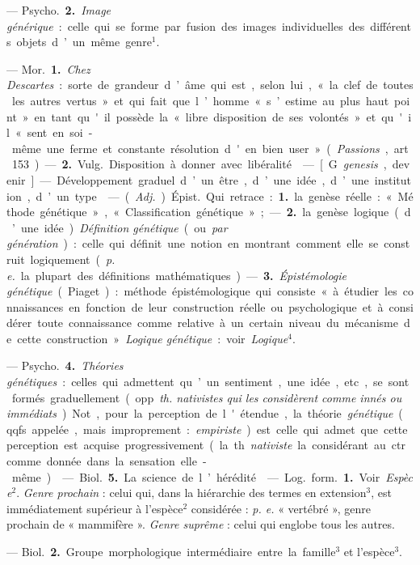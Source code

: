 \begin{itemize}[leftmargin=1cm, label=, itemsep=1pt]
— \si{Psycho.} {\bf 2.} {\it Image générique} : celle qui se forme par fusion
des images individuelles des différents objets d’un même genre$^1$.

 — \si{Mor.} {\bf 1.} {\it Chez Descartes} : sorte de grandeur
d’âme qui est, selon lui, « la clef de toutes les autres vertus » et qui fait
que l’homme « s’estime au plus haut point » en tant qu'il possède la « libre
disposition de ses volontés » et qu'il « sent en soi-même une ferme et
constante résolution d'en bien user » ({\it Passions}, art. 153). —
{\bf 2.} \si{Vulg.} Disposition à donner avec libéralité.

 — [G. {\it genesis}, devenir] — Développement graduel d’un être,
d’une idée, d’une institution, d’un type.

 — ({\it Adj.}) \si{Épist.} Qui retrace : {\bf 1.} la genèse réelle :
« Méthode génétique », « Classification génétique » ; — {\bf 2.} la genèse
logique (d’une idée). {\it Définition génétique} (ou {\it par génération}) :
celle qui définit une notion en montrant comment elle se construit
logiquement ({\it p. e.} la plupart
des définitions mathématiques). — {\bf 3.} {\it Épistémologie génétique}
(Piaget) : méthode épistémologique qui consiste « à étudier les connaissances
en fonction de leur construction réelle ou psychologique et à considérer
toute connaissance comme relative à un certain niveau du mécanisme de cette
construction ». {\it Logique génétique} : voir {\it Logique}$^4$.

— \si{Psycho.} {\bf 4.} {\it Théories génétiques} : celles qui admettent
qu’un sentiment, une idée, etc., se sont formés graduellement (opp.
{\it th. nativistes qui les considèrent comme innés ou immédiats}). Not.,
pour la perception de l'étendue, la théorie {\it génétique} (qqfs. appelée,
mais improprement : {\it empiriste}) est celle qui admet que cette perception
est acquise progressivement (la th. {\it nativiste} la considérant au ctr.
comme donnée dans la sensation elle-même).

 — \si{Biol.} {\bf 5.} La science de l’hérédité.

 — \si{Log.} \si{form.} {\bf 1.} Voir {\it Espèce}$^2$.
{\it Genre prochain} : celui qui, dans la hiérarchie des termes en
extension$^3$, est immédiatement supérieur à l’espèce$^2$ considérée :
{\it p. e.} « vertébré », genre prochain de « mammifère ».
{\it Genre suprême} : celui qui englobe tous les autres.

— \si{Biol.} {\bf 2.} Groupe morphologique intermédiaire entre la famille$^3$
et l'espèce$^3$.


\end{itemize}
